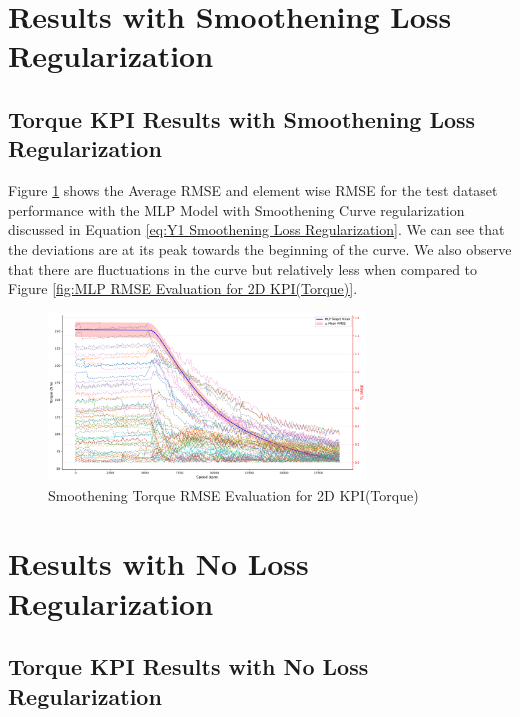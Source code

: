 \documentclass{report} %
\begin{document}
\section{Results with Smoothening Loss Regularization}\label{sec:Results with Smoothening Loss Regularization}

\subsection{Torque \ac{KPI} Results with Smoothening Loss Regularization}\label{subsec:2D Torque Results with Smoothening Loss Regularization}

Figure \ref{fig:Smoothening Torque RMSE Evaluation for 2D KPI(Torque)} shows the Average \ac{RMSE} and element wise \ac{RMSE} for the test dataset performance 
with the MLP Model with Smoothening Curve regularization discussed in Equation \ref{eq:Y1 Smoothening Loss Regularization}.
We can see that the deviations are at its peak towards the beginning of the curve. 
We also observe that there are fluctuations in the curve but relatively less when compared to Figure \ref{fig:MLP RMSE Evaluation for 2D KPI(Torque)}.
\begin{figure}[H]
    \centering
    \includegraphics[width=0.75\textwidth]{./ReportImages/RMSE_MLP_Smoothening_y1.png} 
    \caption{Smoothening Torque \ac{RMSE} Evaluation for 2D KPI(Torque)} 
    \label{fig:Smoothening Torque RMSE Evaluation for 2D KPI(Torque)}
\end{figure}

\section{Results with No Loss Regularization}\label{sec:Results with No Loss Regularization}
\subsection{Torque \ac{KPI} Results with No Loss Regularization}\label{subsec:2D Torque Results with No Loss Regularization}
\end{document}
